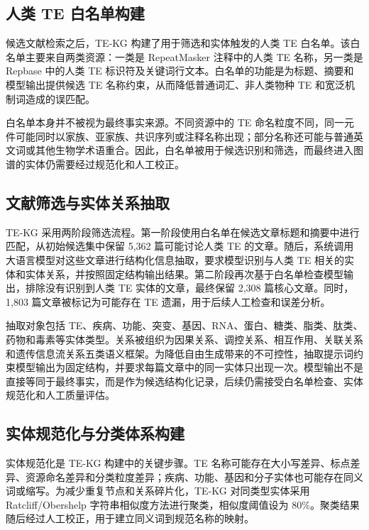 \documentclass[12pt,a4paper,UTF8]{ctexart}
\begin{document}
\subsection{人类 TE 白名单构建}

候选文献检索之后，TE-KG 构建了用于筛选和实体触发的人类 TE 白名单。该白名单主要来自两类资源：一类是 RepeatMasker 注释中的人类 TE 名称，另一类是 Repbase 中的人类 TE 标识符及关键词行文本\cite{jurka2005repbase,smit2015repeatmasker}。白名单的功能是为标题、摘要和模型输出提供候选 TE 名称约束，从而降低普通词汇、非人类物种 TE 和宽泛机制词造成的误匹配。

白名单本身并不被视为最终事实来源。不同资源中的 TE 命名粒度不同，同一元件可能同时以家族、亚家族、共识序列或注释名称出现；部分名称还可能与普通英文词或其他生物学术语重合。因此，白名单被用于候选识别和筛选，而最终进入图谱的实体仍需要经过规范化和人工校正。

\subsection{文献筛选与实体关系抽取}

TE-KG 采用两阶段筛选流程。第一阶段使用白名单在候选文章标题和摘要中进行匹配，从初始候选集中保留 5,362 篇可能讨论人类 TE 的文章。随后，系统调用大语言模型对这些文章进行结构化信息抽取，要求模型识别与人类 TE 相关的实体和实体关系，并按照固定结构输出结果。第二阶段再次基于白名单检查模型输出，排除没有识别到人类 TE 实体的文章，最终保留 2,308 篇核心文章。同时，1,803 篇文章被标记为可能存在 TE 遗漏，用于后续人工检查和误差分析。

抽取对象包括 TE、疾病、功能、突变、基因、RNA、蛋白、糖类、脂类、肽类、药物和毒素等实体类型。关系被组织为因果关系、调控关系、相互作用、关联关系和遗传信息流关系五类语义框架。为降低自由生成带来的不可控性，抽取提示词约束模型输出为固定结构，并要求每篇文章中的同一实体只出现一次。模型输出不是直接等同于最终事实，而是作为候选结构化记录，后续仍需接受白名单检查、实体规范化和人工质量评估。

\subsection{实体规范化与分类体系构建}

实体规范化是 TE-KG 构建中的关键步骤。TE 名称可能存在大小写差异、标点差异、资源命名差异和分类粒度差异；疾病、功能、基因和分子实体也可能存在同义词或缩写。为减少重复节点和关系碎片化，TE-KG 对同类型实体采用 Ratcliff/Obershelp 字符串相似度方法进行聚类，相似度阈值设为 80\%\cite{ratcliff1988pattern}。聚类结果随后经过人工校正，用于建立同义词到规范名称的映射。
\end{document}
